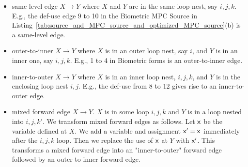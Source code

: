 \begin{itemize}
\item same-level edge $X\rightarrow Y$ where $X$ and $Y$ are in the same loop nest, say $i,j,k$. E.g., the def-use edge 9 to 10 in the Biometric MPC Source in Listing~\ref{tab:source_and_MPC_source_and_optimized_MPC_source}(b) is a same-level edge. 
\item outer-to-inner $X\rightarrow Y$ where $X$ is in an outer loop nest, say $i$, and $Y$ is in an inner one, say $i,j,k$. E.g., 1 to 4 in Biometric forms is an outer-to-inner edge.
\item inner-to-outer $X\rightarrow Y$ where $X$ is in an inner loop nest, $i,j,k$, and $Y$ is in the enclosing loop nest $i,j$. E.g., the def-use from 8 to 12 gives rise to an inner-to-outer edge.


\item mixed forward edge $X\rightarrow Y$. $X$ is in some loop $i,j,k$ and $Y$ is in a loop nested into $i,j,k'$. We transform mixed forward edges as follows. Let ${\sf {x}}$ be the variable defined at $X$. We add a variable and assignment ${\sf {x}}' = {\sf {x}}$ immediately after the $i,j,k$ loop. Then we replace the use of ${\sf {x}}$ at $Y$ with ${\sf {x}}'$. This transforms a mixed forward edge into an "inner-to-outer" forward edge followed by an outer-to-inner forward edge. %
 \end{itemize}

